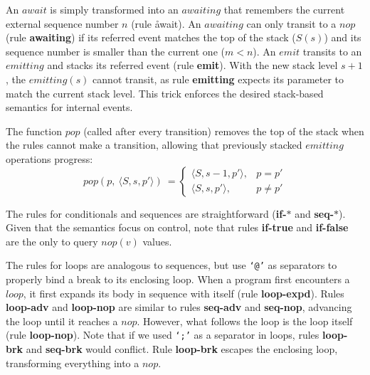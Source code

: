 \documentclass{acm_proc_article-sp}
\newcommand{\CEU}{\textsc{C\'{e}u}\xspace}
\newcommand{\code}[1] {{\small{\texttt{#1}}}}
\newcommand{\LL}{\langle}
\newcommand{\RR}{\rangle}
\newcommand{\rr}[1] {{\textbf{\scriptsize{#1}}}}
\newcommand{\1}{\;}
\newcommand{\2}{\;\;}
\newcommand{\3}{\;\;\;}
\newcommand{\5}{\;\;\;\;\;}
\begin{document}
An $await$ is simply transformed into an $awaiting$ that remembers the current 
external sequence number $n$ (rule \r{await}).
An $awaiting$ can only transit to a $nop$ (rule \rr{awaiting}) if its referred 
event matches the top of the stack ($S(s)$) and its sequence number is smaller 
than the current one ($m<n$).
%
%
An $emit$ transits to an $emitting$ and stacks its referred event (rule 
\rr{emit}).
With the new stack level $s+1$, the $emitting(s)$ cannot transit, as rule 
\rr{emitting} expects its parameter to match the current stack level.
This trick enforces the desired stack-based semantics for internal events.

The function $pop$ (called after every transition) removes the top of the stack 
when the rules cannot make a transition, allowing that previously stacked 
$emitting$ operations progress:
%
\[
pop(p,~\LL S, s, p' \RR)~=
\begin{cases}
    \LL S, s-1, p' \RR, & p = p' \\
    \LL S, s,   p' \RR, & p \neq p'
\end{cases}
\]
%
\begin{comment}
The first two cases query the $awaiting$ and $emitting$ operations to check if 
they are blocked.
Note that the test predicates are reversed in comparison to the semantic rules 
\rr{awaiting} and \rr{emitting} (i.e. they test when \emph{not} to advance).
Note also that $nop$ is not considered a blocked operation.

An emitted event remains at the top of the stack while there are matching 
$awaiting$ operations---only after the $isBlocked$ predicate becomes true that 
the $pop$ function takes effect.
This behavior provides the desired broadcast communication for events.
\end{comment}

The rules for conditionals and sequences are straightforward (\rr{if-$*$} and 
\rr{seq-$*$}).
%
Given that the semantics focus on control, note that rules \rr{if-true} and 
\rr{if-false} are the only to query $nop(v)$ values.

The rules for loops are analogous to sequences, but use \code{`@'} as 
separators to properly bind a break to its enclosing loop.
%
When a program first encounters a $loop$, it first expands its body in sequence 
with itself (rule \rr{loop-expd}).
Rules \rr{loop-adv} and \rr{loop-nop} are similar to rules \rr{seq-adv} and 
\rr{seq-nop}, advancing the loop until it reaches a $nop$.
However, what follows the loop is the loop itself (rule \rr{loop-nop}).
Note that if we used \code{`;'} as a separator in loops, rules \rr{loop-brk} 
and \rr{seq-brk} would conflict.
%
Rule \rr{loop-brk} escapes the enclosing loop, transforming everything into a 
$nop$.
\end{document}
